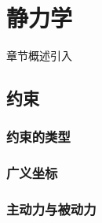 \chapter{静力学}\label{4}

章节概述引入

\section{约束}\label{4-1}

\subsection{约束的类型}\label{4-1-1}

\subsection{广义坐标}\label{4-1-2}

\subsection{主动力与被动力}\label{4-1-3}

